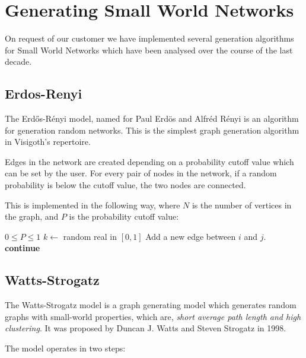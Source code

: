 \documentclass[a4paper,11pt,titlepage]{article}
\let\stdsection\section         %
\renewcommand{\section}{\newpage\stdsection}
\begin{document}
\section{Generating Small World Networks}

On request of our customer we have implemented several generation
algorithms for Small World Networks which have been analysed over
the course of the last decade.

\subsection{Erdos-Renyi}
The Erd\H{o}s-R\'{e}nyi model, named for Paul Erd\"{o}s and Alfr\'{e}d R\'{e}nyi
is an algorithm for generation random networks. This is the simplest graph
generation algorithm in Visigoth's repertoire.

Edges in the network are created depending on a probability cutoff value which
can be set by the user. For every pair of nodes in the network, if a random
probability is below the cutoff value, the two nodes are connected.

This is implemented in the following way, where $N$ is the number of vertices
in the graph, and $P$ is the probability cutoff value:
\begin{algorithmic}
  \REQUIRE $0 \leq P \leq 1$
      \STATE $k \gets $ random real in $[0, 1]$
        \STATE Add a new edge between $i$ and $j$.
      \ELSE
        \STATE \textbf{continue}
      \ENDIF
    \ENDFOR
  \ENDFOR
\end{algorithmic}

\subsection{Watts-Strogatz}
The Watts-Strogatz model is a graph generating model which generates random
graphs with small-world properties, which are, \emph{short average path length and
high clustering}. It was proposed by Duncan J. Watts and Steven Strogatz in 1998.

The model operates in two steps:
\end{document}
